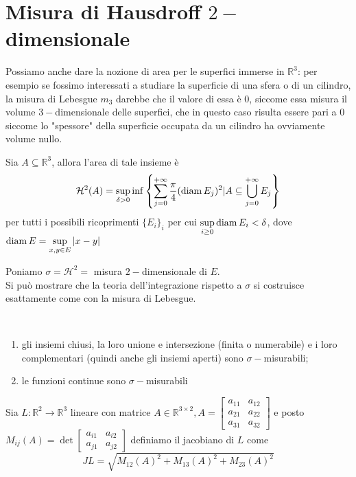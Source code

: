 \section{Misura di Hausdroff $2-$dimensionale}

Possiamo anche dare la nozione di area per le superfici immerse in $\mathbb{R}^3$: per esempio se fossimo interessati a studiare la superficie di una sfera o di un cilindro, la misura di Lebesgue $m_3$ darebbe che il valore di essa è $0$, siccome essa misura
il volume $3-$dimensionale delle superfici, che in questo caso risulta essere pari a $0$ siccome lo "spessore" della superficie occupata da un cilindro ha ovviamente volume nullo. \\
\begin{definition}
	Sia $A \subseteq \mathbb{R}^3$, allora l'area di tale insieme è
	$$
		\mathcal{H}^2(A) = \sup_{\delta > 0} \inf \left\{ \sum_{j=0}^{+\infty} \frac{\pi}{4} (\operatorname{diam} E_j)^2 | A \subseteq \bigcup_{j=0}^{+\infty} E_j \right\}
	$$
	per tutti i possibili ricoprimenti $\{ E_i \}_i$ per cui $\sup\limits_{i \geq 0} \operatorname{diam} E_i < \delta$, dove $\operatorname{diam} E = \sup\limits_{x, y \in E} |x-y|$
\end{definition}
Poniamo $\sigma=\mathcal{H}^2=$ misura $2-$dimensionale di $E$. \\
Si può mostrare che la teoria dell'integrazione rispetto a $\sigma$ si costruisce esattamente come con la misura di Lebesgue. 
\begin{theorem}[A1] \hspace{1cm} \\ \vspace{-0.5cm}
	\begin{enumerate}[label=\protect\circled{\arabic*}]
		\item gli insiemi chiusi, la loro unione e intersezione (finita o numerabile) e i loro complementari (quindi anche gli insiemi aperti) sono $\sigma-$misurabili;
		\item le funzioni continue sono $\sigma-$misurabili
	\end{enumerate}
\end{theorem}
\begin{definition}
Sia $L:\mathbb{R}^2 \to \mathbb{R}^3$ lineare con matrice $A \in \mathbb{R}^{3 \times 2}, A = \begin{bmatrix} a_{11} & a_{12} \\ a_{21} & a_{22} \\ a_{31} & a_{32} \end{bmatrix}$ e posto $M_{ij}(A) = \det \begin{bmatrix} a_{i1} & a_{i2} \\ a_{j1} & a_{j2} \end{bmatrix}$ definiamo
il jacobiano di $L$ come
$$
JL = \sqrt{M_{12}(A)^2 + M_{13}(A)^2 + M_{23}(A)^2}
$$
\end{definition}
